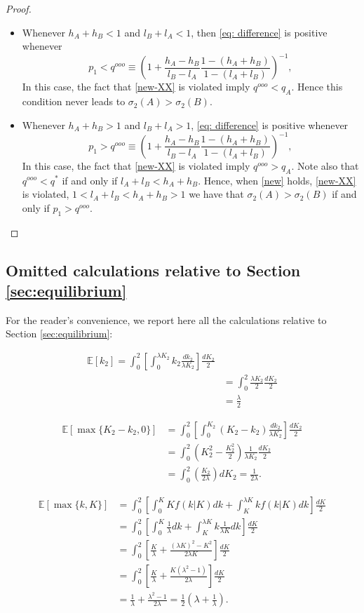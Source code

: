 \documentclass[12pt,american]{paper}
\theoremstyle{remark}
\begin{document}
\begin{proof}
\begin{itemize}
\item Whenever $h_A+h_B<1$ and $l_B+l_A<1$, then \eqref{eq: difference} is positive whenever 
\[  p_1<q^{ooo}\equiv\left(1+\frac{h_A-h_B}{l_B-l_A}\frac{1-(h_A+h_B)}{1-(l_A+l_B)} \right)^{-1},
\]
In this case, the fact that \eqref{new-XX} is violated imply $q^{ooo}<q_A$. Hence this condition never leads to $\sigma_2(A)>\sigma_2(B)$.

\item Whenever $h_A+h_B>1$ and $l_B+l_A>1$, \eqref{eq: difference} is positive whenever 
\[  p_1>q^{ooo}\equiv\left(1+\frac{h_A-h_B}{l_B-l_A}\frac{1-(h_A+h_B)}{1-(l_A+l_B)} \right)^{-1},
\]
In this case, the fact that \eqref{new-XX} is violated imply $q^{ooo}>q_A$. Note also that $q^{ooo}<q^*$ if and only if $l_A+l_B<h_A+h_B$. Hence, when \eqref{new} holds, \eqref{new-XX} is violated, $1<l_A+l_B<h_A+h_B>1$ we have that  $\sigma_2(A)>\sigma_2(B)$ if and only if $p_1>q^{ooo}$.
\end{itemize}
\end{proof}




\subsection*{Omitted calculations relative to Section \ref{sec:equilibrium}}\label{omitted calculations}

For the reader's convenience, we report here all the calculations relative to Section \ref{sec:equilibrium}:

\begin{align*}
\mathbb E[k_2]=\int_0^2 \left[ \int_0^{\lambda K_2} k_2 \frac{dk_2}{\lambda K_2} \right] \frac{dK_2}{2}\\
&= \int_0^2 \frac{\lambda K_2}{2} \frac{dK_2}{2}\\
&=\frac{\lambda}{2}
\end{align*}

\begin{align*}
\mathbb E[\max\{K_2-k_2,0\}]&=\int_0^2 \left[ \int_0^{ K_2}(K_2- k_2) \frac{dk_2}{\lambda K_2} \right] \frac{dK_2}{2}\\
&= \int_0^2 \left(K^2_2 - \frac{K^2_2}{2} \right) \frac{1}{\lambda K_2}  \frac{dK_2}{2}\\
&= \int_0^2 \left(\frac{K_2}{2\lambda} \right) dK_2= \frac{1}{2\lambda}.
\end{align*}

\begin{align*}
\mathbb E[\max\{k,K\}] &=\int_0^2 \left[\int_0^K K f(k|K)dk+\int_K^{\lambda K} k f(k|K)dk \right]\frac{dK}{2}\\
&= \int_0^2 \left[\int_0^K \frac{1}{\lambda }dk+\int_K^{\lambda K} k \frac{1}{\lambda K}dk\right]\frac{dK}{2}\\
&=\int_0^2 \left[\frac{K}{\lambda}+\frac{(\lambda K)^2 -K^2}{2\lambda K}\right]\frac{dK}{2}\\
&=\int_0^2 \left[\frac{K}{\lambda}+ \frac{K(\lambda^2 -1)}{2\lambda}\right]\frac{dK}{2}\\
&=\frac{1}{\lambda}+\frac{\lambda^2 -1}{2\lambda}=\frac{1}{2}\left(\lambda + \frac{1}{\lambda} \right).
\end{align*}
\end{document}
